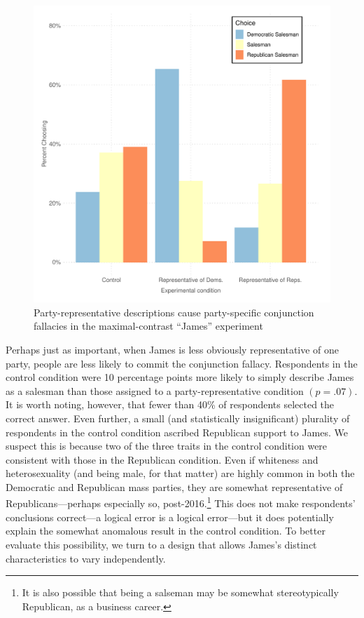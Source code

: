 \documentclass[12pt, letterpaper]{article}
\begin{document}
\begin{figure}
\caption{Party-representative descriptions cause party-specific conjunction fallacies in the maximal-contrast ``James'' experiment}
\label{fig:James}
\begin{center}
\includegraphics[width=1\textwidth]{../figs/fig_2_mturk_prop_by_treat_party_rep.pdf}
\end{center}
\end{figure}

Perhaps just as important, when James is less obviously representative of one party, people are less likely to commit the conjunction fallacy. Respondents in the control condition were 10 percentage points more likely to simply describe James as a salesman than those assigned to a party-representative condition $(p=.07)$. It is worth noting, however, that fewer than 40\% of respondents selected the correct answer. Even further, a small (and statistically insignificant) plurality of respondents in the control condition ascribed Republican support to James. We suspect this is because two of the three traits in the control condition were consistent with those in the Republican condition. Even if whiteness and heterosexuality (and being male, for that matter) are highly common in both the Democratic and Republican mass parties, they are somewhat representative of Republicans---perhaps especially so, post-2016.\footnote{It is also possible that being a salseman may be somewhat stereotypically Republican, as a business career.} This does not make respondents' conclusions correct---a logical error is a logical error---but it does potentially explain the somewhat anomalous result in the control condition. To better evaluate this possibility, we turn to a design that allows James's distinct characteristics to vary independently.
\end{document}
